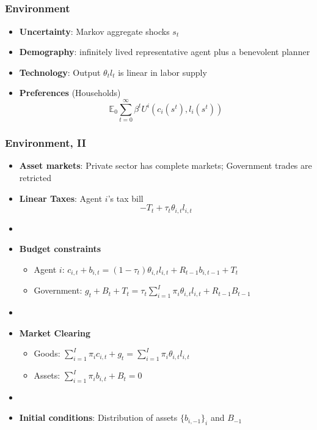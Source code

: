 \documentclass{beamer}
\begin{document}
\subsection{}

\begin{frame}
 \frametitle{Environment}
 \begin{itemize}
 \item \textbf{Uncertainty}: Markov aggregate shocks $s_t$
  \item \textbf{Demography}: infinitely lived representative agent plus a benevolent planner
  \item \textbf{Technology}: Output  $\theta_{t} l_{t}$ is linear in labor supply
  \item \textbf{Preferences }(Households)
  \begin{equation*}
\mathbb{E}_{0}\sum_{t=0}^{\infty } \beta^t  U^{i}\left(
c_{i}(s^t),l_{i}(s^t)\right)  \label{utility lifetime}
\end{equation*}%
 \end{itemize}

\end{frame}

\begin{frame}
 \frametitle{Environment, II}
 \begin{itemize}
\item \textbf{Asset markets}: Private sector has complete markets; Government trades are retricted
  \item \textbf{Linear Taxes}: Agent $i$'s tax bill
\[- T_t + \tau_t \theta_{i,t}l_{i,t}\]

\item[]
  \item \textbf{Budget constraints}
  \begin{itemize}
   \item Agent $i$: $ c_{i,t}+b_{i,t}=\left( 1-\tau _{t}\right) \theta _{i,t}l_{i,t}+R_{t-1}b_{i,t-1}+T_{t}$
\item Government: $g_{t}+B_{t}+T_t=\tau _{t}\sum_{i=1}^{I}\pi _{i}\theta_{i,t}l_{i,t}+R_{t-1}B_{t-1}$
  \end{itemize}

\item[]
  \item \textbf{Market Clearing}
  \begin{itemize}
   \item Goods: $\sum_{i=1}^{I}\pi_{i}c_{i,t}+g_t =\sum_{i=1}^{I}\pi
_{i}\theta _{i,t} l_{i,t}$

   \item Assets: $\sum_{i=1}^{I}\pi _{i}b_{i,t}+B_{t}=0$
\end{itemize}
  \item[]

\item \textbf{Initial conditions}: Distribution of assets $\{b_{i,-1}\}_i$ and $B_{-1}$
\end{itemize}

\end{frame}
\end{document}
